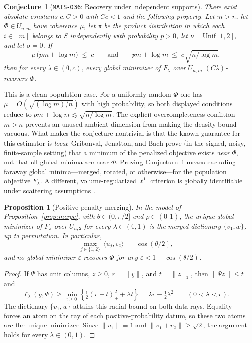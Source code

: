 \documentclass[11pt]{amsart}
\newcommand{\Oid}[1]{\href{https://github.com/lionellevine/MAIS/blob/main/open-problems/MAIS-O#1.md}{\texttt{MAIS-O#1}}}
\theoremstyle{plain}
\newtheorem{proposition}[theorem]{Proposition}
\newtheorem{conjecture}[theorem]{Conjecture}
\theoremstyle{definition}
\begin{document}
\begin{conjecture}[\Oid{36}: Recovery under independent supports]\label{conj:independent}
There exist absolute constants $c,C>0$ with $Cc<1$ and the following property. Let $m>n$, let $\Phi\in U_{n,m}$ have coherence $\mu$, let $\pi$ be the product distribution in which each $i\in[m]$ belongs to $S$ independently with probability $p>0$, let $\nu=\mathrm{Unif}[1,2]$, and let $\sigma=0$. If
\[
  \mu\,\bigl(pm+\log m\bigr)\;\le\;c
  \qquad\text{and}\qquad
  pm+\log m\;\le\;c\,\sqrt{n/\log m},
\]
then for every $\lambda\in(0,c)$, every global minimizer of $F_\lambda$ over $U_{n,m}$ $(C\lambda)$-recovers $\Phi$.
\end{conjecture}

This is a clean population case. For a uniformly random $\Phi$ one has $\mu=O(\sqrt{(\log m)/n})$ with high probability, so both displayed conditions reduce to $pm+\log m\lesssim\sqrt{n/\log m}$. The explicit overcompleteness condition $m>n$ prevents an unused ambient dimension from making the density bound vacuous. What makes the conjecture nontrivial is that the known guarantee for this estimator is \emph{local}: Gribonval, Jenatton, and Bach \cite{gribonval2015} prove (in the signed, noisy, finite-sample setting) that a minimum of the penalized objective exists \emph{near} $\Phi$, not that all global minima are near $\Phi$. Proving Conjecture~\ref{conj:independent} means excluding faraway global minima---merged, rotated, or otherwise---for the population objective $F_\lambda$. A different, volume-regularized $\ell^1$ criterion is globally identifiable under scattering assumptions \cite{hu2023,sun2025}.

\begin{proposition}[Positive-penalty merging]\label{prop:nested}
In the model of Proposition~\ref{prop:merge}, with $\theta\in(0,\pi/2]$ and $\rho\in(0,1)$, the unique global minimizer of $F_\lambda$ over $U_{n,2}$ for every $\lambda\in(0,1)$ is the merged dictionary $\{v_1,w\}$, up to permutation. In particular,
\[
  \max_{j\in\{1,2\}}\ \langle u_j, v_2\rangle\ =\ \cos(\theta/2),
\]
and no global minimizer $\varepsilon$-recovers $\Phi$ for any $\varepsilon<1-\cos(\theta/2)$.
\end{proposition}

\begin{proof}
If $\Psi$ has unit columns, $z\ge0$, $r=\|y\|$, and $t=\|z\|_1$, then $\|\Psi z\|\le t$ and
\[
\ell_\lambda(y,\Psi)\ge
\min_{t\ge0}\left\{\tfrac12(r-t)_+^2+\lambda t\right\}
=\lambda r-\tfrac12\lambda^2\qquad(0<\lambda<r).
\]
The dictionary $\{v_1,w\}$ attains this radial bound on both data rays. Equality forces an atom on the ray of each positive-probability datum, so these two atoms are the unique minimizer. Since $\|v_1\|=1$ and $\|v_1+v_2\|\ge\sqrt2$, the argument holds for every $\lambda\in(0,1)$.
\end{proof}
\end{document}
